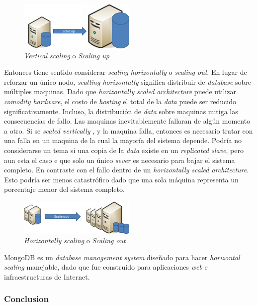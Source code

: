 \begin{figure}[h!]
	\centering
	\includegraphics[width=0.5\textwidth]{figuras/cap2/scale_up.png}
	\caption{\textit{Vertical scaling} o \textit{Scaling up} }
\end{figure}

Entonces tiene sentido  considerar \textit{scaling horizontally} o \textit{scaling out}. En lugar de reforzar un único nodo, \textit{scalling horizontally} significa distribuir de \textit{database} sobre múltiples maquinas. Dado que \textit{horizontally scaled architecture} puede utilizar \textit{comodity hardware}, el costo de \textit{hosting} el total de la \textit{data} puede ser reducido significativamente. Incluso, la distribución  de \textit{data} sobre maquinas mitiga las consecuencias de fallo. Las maquinas inevitablemente fallaran de algún momento a otro. Si se \textit{scaled vertically} , y la maquina falla, entonces es necesario tratar con una falla en un maquina de la cual la mayoría del sistema depende. Podría no considerarse un tema si una copia de la \textit{data} existe en un \textit{replicated slave}, pero aun esta el caso e que solo un único \textit{sever} es necesario para bajar el sistema completo. En contraste con el fallo dentro de un \textit{horizontally scaled architecture}. Esto podría ser menos catastrófico dado que una sola máquina representa un porcentaje menor del sistema completo.

\begin{figure}[h!]
	\centering
	\includegraphics[width=0.5\textwidth]{figuras/cap2/scale_out.png}
	\caption{\textit{Horizontally scaling} o \textit{Scaling out} }
\end{figure}

MongoDB es un \textit{database management system} diseñado para hacer \textit{horizontal scaling} manejable, dado que fue construido para aplicaciones \textit{web} e infraestructuras de Internet.

\subsubsection{Conclusion}

